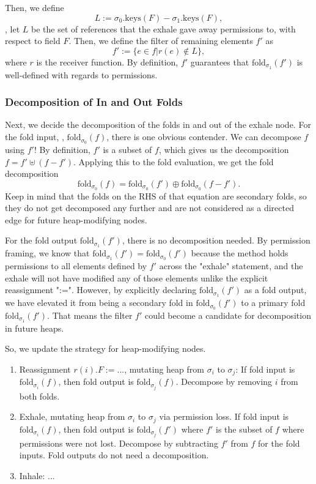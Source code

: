 \documentclass[msc,oneside]{ubcthesis}
\begin{document}
Then, we define 
$$L := \sigma_0.\textrm{keys}(F) - \sigma_1.\textrm{keys}(F),$$
\ie, let $L$ be the set of references that the exhale gave away permissions to, with respect to field $F$. Then, we define the filter of remaining elements $f'$ as
$$f' := \{e \in f | r(e) \not\in L \},$$ where $r$ is the receiver function. By definition, $f'$ guarantees that $\textrm{fold}_{\sigma_1}(f')$ is well-defined with regards to permissions. 

\subsubsection{Decomposition of In and Out Folds}
Next, we decide the decomposition of the folds in and out of the exhale node. For the fold input, \ie, $\textrm{fold}_{\sigma_0}(f)$,  there is one obvious contender. We can decompose $f$ using $f'$! By definition,  $f'$ is a subset of $f$, which gives us the decomposition $f = f' \uplus (f-f')$. Applying this to the fold evaluation, we get the fold decomposition
$$\textrm{fold}_{\sigma_0}(f) = \textrm{fold}_{\sigma_0}(f') \oplus \textrm{fold}_{\sigma_0}(f - f').$$ Keep in mind that the folds on the RHS of that equation are secondary folds, so they do not get decomposed any further and are not considered as a directed edge for future heap-modifying nodes.

For the fold output $\textrm{fold}_{\sigma_1}(f')$, there is no decomposition needed. By permission framing, we know that $\textrm{fold}_{\sigma_1}(f') = \textrm{fold}_{\sigma_0}(f')$ because the method holds permissions to all elements defined by $f'$ across the "exhale" statement, and the exhale will not have modified any of those elements unlike the explicit reassignment ":=". However, by explicitly declaring $\textrm{fold}_{\sigma_1}(f')$ as a fold output, we have elevated it from being a secondary fold in $\textrm{fold}_{\sigma_0}(f')$ to a primary fold $\textrm{fold}_{\sigma_1}(f')$. That means the filter $f'$ could become a candidate for decomposition in future heaps.

So, we update the strategy for heap-modifying nodes.
\begin{enumerate}
    \item Reassignment $r(i).F := ...$, mutating heap from $\sigma_i$ to $\sigma_j$: 
    If fold input is $\textrm{fold}_{\sigma_i}(f)$, then fold output is $\textrm{fold}_{\sigma_j}(f)$. 
    Decompose by removing $i$ from both folds.
    \item Exhale, mutating heap from $\sigma_i$ to $\sigma_j$ via permission loss. If fold input is $\textrm{fold}_{\sigma_i}(f)$, then fold output is $\textrm{fold}_{\sigma_j}(f')$ where $f'$ is the subset of $f$ where permissions were not lost. Decompose by subtracting $f'$ from $f$ for the fold inputs. Fold outputs do not need a decomposition.
    \item Inhale: ...
\end{enumerate}
\end{document}

